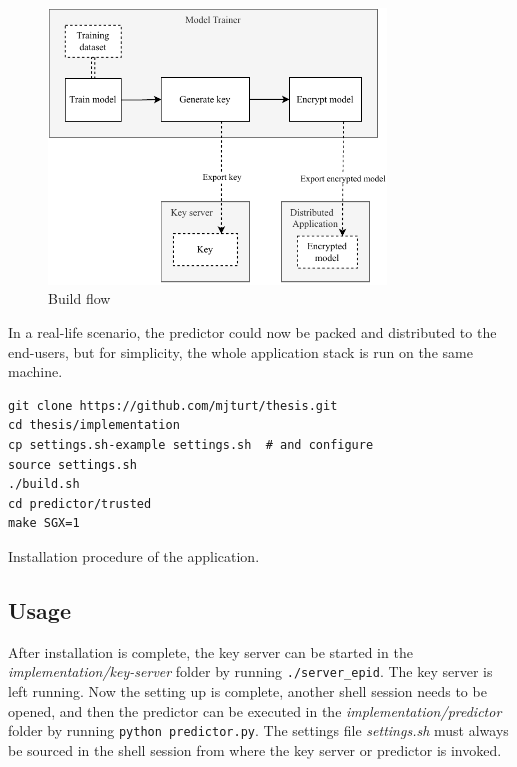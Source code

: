 \begin{figure}
\centering \includegraphics[width=0.8\textwidth]{img/sgx_build}
\caption{Build flow}
\label{fig:sgx-build}
\end{figure}

In a real-life scenario, the predictor could now be packed and distributed to the end-users, but for simplicity, the whole application stack is run on the same machine.

\begin{algorithm}
\begin{verbatim}
git clone https://github.com/mjturt/thesis.git
cd thesis/implementation
cp settings.sh-example settings.sh  # and configure
source settings.sh
./build.sh
cd predictor/trusted
make SGX=1
\end{verbatim}
\caption{Installation procedure of the application.\label{alg:install}}
\end{algorithm}

\subsection{Usage} \label{usage}

After installation is complete, the key server can be started in the \textit{implementation/key-server} folder by running \texttt{./server_epid}. The key server is left running. Now the setting up is complete, another shell session needs to be opened, and then the predictor can be executed in the \textit{implementation/predictor} folder by running \texttt{python predictor.py}. The settings file \textit{settings.sh} must always be sourced in the shell session from where the key server or predictor is invoked.

